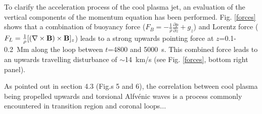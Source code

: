 \documentclass{aa}
\begin{document}
{{\color{blue}To clarify the acceleration process of the cool plasma jet, an evaluation of the vertical components of the momentum equation has been performed. Fig. \ref{forces} shows that a combination of buoyancy force ($F_B = -\frac{1}{\rho}\frac{\partial p}{\partial z} + g_z$) and Lorentz force ($F_L = \frac{1}{\rho}[(\nabla \times {\bf{B}}) \times {\bf{B}}]_z$) leads to a strong upwards pointing force at $z$=0.1-0.2~Mm along the loop between $t$=4800 and 5000~s. This combined force leads to an upwards travelling disturbance of $\sim$14~km/s (see Fig. \ref{forces}, bottom right panel).

As pointed out in section 4.3 (Fig.s 5 and 6), the correlation between cool plasma being propelled upwards and torsional Alfv\'enic waves is a process commonly encountered in transition region and coronal loops...}   







}
\end{document}
